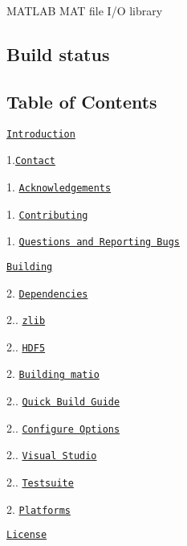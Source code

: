 M\+A\+T\+L\+AB M\+AT file I/O library

\subsection*{Build status}

\href{https://travis-ci.org/tbeu/matio}{\tt } \href{https://scan.coverity.com/projects/tbeu-matio}{\tt } \href{https://coveralls.io/github/tbeu/matio?branch=master}{\tt } \href{https://ci.appveyor.com/project/tbeu/matio/branch/master}{\tt } \href{https://bettercodehub.com/}{\tt }

\subsection*{Table of Contents}


\begin{DoxyEnumerate}
\item \href{#10-introduction}{\tt Introduction}
\begin{DoxyItemize}
\item 1.\href{#11-contact}{\tt Contact}
\item 1. \href{#12-acknowledgements}{\tt Acknowledgements}
\item 1. \href{#13-contributing}{\tt Contributing}
\item 1. \href{#14-questions-and-reporting-bugs}{\tt Questions and Reporting Bugs}
\end{DoxyItemize}
\item \href{#20-building}{\tt Building}
\begin{DoxyItemize}
\item 2. \href{#21-dependencies}{\tt Dependencies}
\begin{DoxyItemize}
\item 2.. \href{#211-zlib}{\tt zlib}
\item 2.. \href{#212-hdf5}{\tt H\+D\+F5}
\end{DoxyItemize}
\item 2. \href{#22-building-matio}{\tt Building matio}
\begin{DoxyItemize}
\item 2.. \href{#221-quick-build-guide}{\tt Quick Build Guide}
\item 2.. \href{#222-configure-options}{\tt Configure Options}
\item 2.. \href{#223-visual-studio}{\tt Visual Studio}
\item 2.. \href{#224-testsuite}{\tt Testsuite}
\end{DoxyItemize}
\item 2. \href{#23-platforms}{\tt Platforms}
\end{DoxyItemize}
\item \href{#30-license}{\tt License}
\end{DoxyEnumerate}

